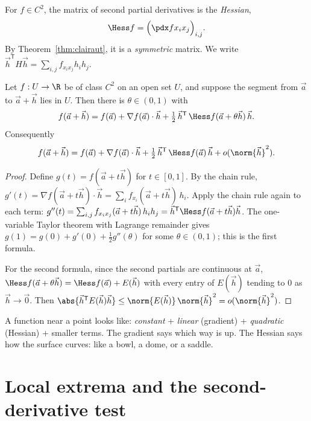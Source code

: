 For $f\in C^2$, the matrix of second partial derivatives is the \emph{Hessian},
\[
\Hess f=\Bigl(\pdx f{x_i}{x_j}\Bigr)_{i,j}.
\]
By Theorem~\ref{thm:clairaut}, it is a \emph{symmetric} matrix. We write $\vec h^{\mathsf T}H\vec h=\sum_{i,j}f_{x_ix_j}h_ih_j$.

\begin{theorem}\label{thm:taylor}
Let $f:U\to\R$ be of class $C^2$ on an open set $U$, and suppose the segment from $\vec a$ to $\vec a+\vec h$ lies in $U$. Then there is $\theta\in(0,1)$ with
\[
f(\vec a+\vec h)=f(\vec a)+\nabla f(\vec a)\cdot\vec h+\tfrac12\,\vec h^{\mathsf T}\,\Hess f(\vec a+\theta\vec h)\,\vec h .
\]
Consequently
\[
f(\vec a+\vec h)=f(\vec a)+\nabla f(\vec a)\cdot\vec h+\tfrac12\,\vec h^{\mathsf T}\,\Hess f(\vec a)\,\vec h+o(\norm{\vec h}^2).
\]
\end{theorem}

\begin{proof}
Define $g(t)=f(\vec a+t\vec h)$ for $t\in[0,1]$. By the chain rule, $g'(t)=\nabla f(\vec a+t\vec h)\cdot\vec h=\sum_if_{x_i}(\vec a+t\vec h)\,h_i$. Apply the chain rule again to each term: $g''(t)=\sum_{i,j}f_{x_ix_j}(\vec a+t\vec h)\,h_ih_j=\vec h^{\mathsf T}\Hess f(\vec a+t\vec h)\vec h$. The one-variable Taylor theorem with Lagrange remainder gives $g(1)=g(0)+g'(0)+\tfrac12g''(\theta)$ for some $\theta\in(0,1)$; this is the first formula.

For the second formula, since the second partials are continuous at $\vec a$, $\Hess f(\vec a+\theta\vec h)=\Hess f(\vec a)+E(\vec h)$ with every entry of $E(\vec h)$ tending to $0$ as $\vec h\to\vec 0$. Then $\abs{\vec h^{\mathsf T}E(\vec h)\vec h}\le\norm{E(\vec h)}\,\norm{\vec h}^2=o(\norm{\vec h}^2)$.
\end{proof}

\begin{intuition}
A function near a point looks like: \emph{constant} + \emph{linear} (gradient) + \emph{quadratic} (Hessian) + smaller terms. The gradient says which way is up. The Hessian says how the surface curves: like a bowl, a dome, or a saddle.
\end{intuition}

\section{Local extrema and the second-derivative test}

